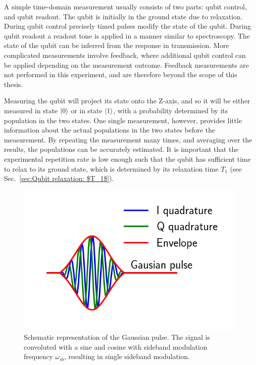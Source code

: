         A simple time-domain measurement usually consists of two parts: qubit control, and qubit readout. The qubit is initially in the ground state due to relaxation. During qubit control precisely timed pulses modify the state of the qubit. During qubit readout a readout tone is applied in a manner similar to spectroscopy. The state of the qubit can be inferred from the response in transmission. More complicated measurements involve feedback, where additional qubit control can be applied depending on the measurement outcome. Feedback measurements are not performed in this experiment, and are therefore beyond the scope of this thesis.

        Measuring the qubit will project its state onto the Z-axis, and so it will be either measured in state $\ket{0}$ or in state $\ket{1}$, with a probability determined by its population in the two states. One single measurement, however, provides little information about the actual populations in the two states before the measurement. By repeating the measurement many times, and averaging over the results, the populations can be accurately estimated. It is important that the experimental repetition rate is low enough such that the qubit has sufficient time to relax to its ground state, which is determined by its relaxation time $T_1$ (see Sec.~\ref{sec:Qubit relaxation: $T_1$}).

        \begin{figure}
          \begin{center}
          \vspace{-30pt}
            \includegraphics[width=\textwidth]{Figures/Exploring frequency reuse/Gaussian pulse.png}
          \end{center}
          \vspace{-20 pt}
          \caption{Schematic representation of the Gaussian pulse. The signal is convoluted with a sine and cosine with sideband modulation frequency $\omega_{sb}$, resulting in single sideband modulation.}
          \label{fig:gaussian pulse}
        \end{figure}

